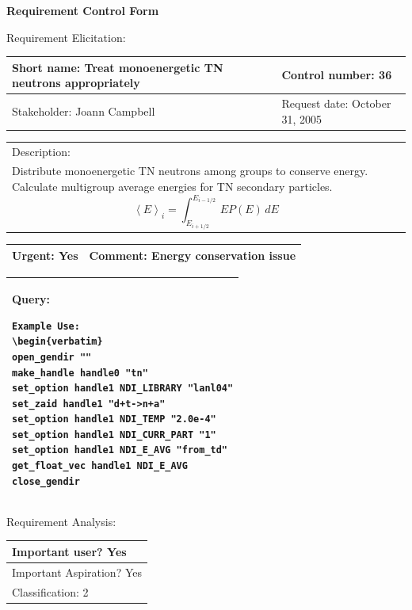 \begin{center}\Large\bf
Requirement Control Form
\end{center}
\vspace{24pt}

Requirement Elicitation:

\begin{tabular}{|p{211pt}|p{211pt}|} \hline
Short name: Treat monoenergetic TN neutrons appropriately & Control
number: 36\\ \hline 
Stakeholder: Joann Campbell & Request date: October 31, 2005\\
\end{tabular}
\begin{tabular}{|p{433pt}|} \hline
Description: \\ 
Distribute monoenergetic TN neutrons among groups to conserve energy.
Calculate multigroup average energies for TN secondary particles.
\begin{displaymath}
\left<E\right>_i = \int_{E_{i+1/2}}^{E_{i-1/2}}\, E P(E)\,dE
\end{displaymath}
\end{tabular} 
\begin{tabular}{|p{211pt}|p{211pt}|} \hline
Urgent: Yes & Comment: Energy conservation issue\\ \hline
\end{tabular}

\vspace{12pt}

\begin{tabular}{|p{433pt}|} \hline
Query: 
\begin{verbatim}
Example Use: 
\begin{verbatim}
open_gendir ""
make_handle handle0 "tn"
set_option handle1 NDI_LIBRARY "lanl04"
set_zaid handle1 "d+t->n+a"
set_option handle1 NDI_TEMP "2.0e-4"
set_option handle1 NDI_CURR_PART "1"
set_option handle1 NDI_E_AVG "from_td"
get_float_vec handle1 NDI_E_AVG
close_gendir
\end{verbatim}
\\ \hline
\end{tabular}
\vspace{24pt}

Requirement Analysis:

\begin{tabular}{|p{433pt}|} \hline
Important user? Yes \\ \hline
Important Aspiration? Yes \\ \hline
Classification: 2 \\ \hline
\end{tabular}

